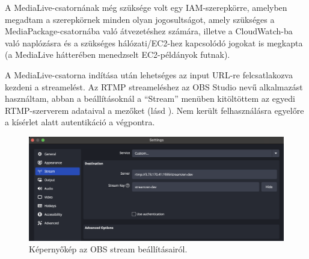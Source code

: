 A MediaLive-csatornának még szüksége volt egy IAM-szerepkörre, amelyben megadtam a szerepkörnek minden olyan jogosultságot, amely szükséges a MediaPackage-csatornába való átvezetéshez számára, illetve a CloudWatch-ba való naplózásra és a szükséges hálózati/EC2-hez kapcsolódó jogokat is megkapta (a MediaLive hátterében menedzselt EC2-példányok futnak).

A MediaLive-csatorna indítása után lehetséges az input URL-re felcsatlakozva kezdeni a streamelést. Az RTMP streameléshez az OBS Studio nevű alkalmazást használtam\cite{obsMediaLive}, abban a beállításoknál a ``Stream'' menüben kitöltöttem az egyedi RTMP-szerverem adataival a mezőket (lásd ). Nem került felhasználásra egyelőre a kísérlet alatt autentikáció a végpontra.

\begin{figure}[ht]
  \centering
  \includegraphics[width=150mm, keepaspectratio]{figures/obs.png}
  \caption{Képernyőkép az OBS stream beállításairól.}
  \label{fig:obs}
\end{figure}
